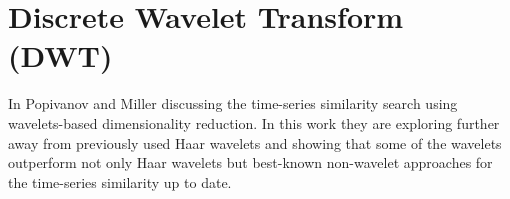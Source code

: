 \section{Discrete Wavelet Transform (DWT)}
In \cite{citeulike:3734066} Popivanov and Miller discussing the time-series similarity search using wavelets-based dimensionality reduction. In this work they are exploring further away from previously used Haar wavelets \cite{citeulike:4384535} and showing that some of the wavelets outperform not only Haar wavelets but best-known non-wavelet approaches for the time-series similarity up to date.